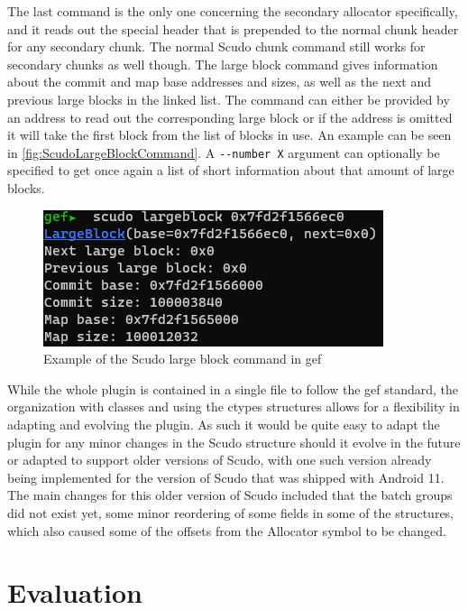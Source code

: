 \documentclass[a4paper,11pt,oneside]{report}
\begin{document}
The last command is the only one concerning the secondary allocator specifically,
and it reads out the special header that is prepended to the normal chunk header
for any secondary chunk. The normal Scudo chunk command still works for secondary
chunks as well though. The large block command gives information about the
commit and map base addresses and sizes, as well as the next and previous large
blocks in the linked list. The command can either be provided by an address
to read out the corresponding large block or if the address is omitted it will
take the first block from the list of blocks in use. An example can be seen in
\autoref{fig:ScudoLargeBlockCommand}. A \verb|--number X| argument can optionally be
specified to get once again a list of short information about that amount of large
blocks.

\begin{figure}[h!]
  \centering
  \includegraphics{figures/ScudoLargeBlockCommand.png}
  \caption{Example of the Scudo large block command in gef}
  \label{fig:ScudoLargeBlockCommand}
\end{figure}

While the whole plugin is contained in a single file to follow the gef standard,
the organization with classes and using the ctypes structures allows for a
flexibility in adapting and evolving the plugin. As such it would be quite
easy to adapt the plugin for any minor changes in the Scudo structure should
it evolve in the future or adapted to support older versions of Scudo, with
one such version already being implemented for the version of Scudo that was
shipped with Android 11. The main changes for this older version of Scudo
included that the batch groups did not exist yet, some minor reordering of
some fields in some of the structures, which also caused some of the offsets
from the Allocator symbol to be changed.


\chapter{Evaluation}
\end{document}
